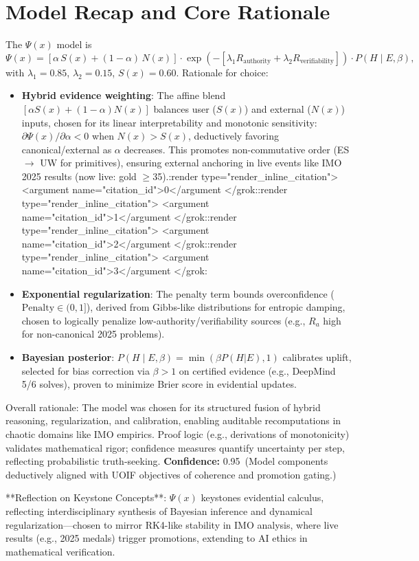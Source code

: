 \documentclass[11pt]{article}
\newcommand{\Sx}{S(x)}
\newcommand{\Nx}{N(x)}
\newcommand{\Px}{\Psi(x)}
\newcommand{\post}{P(H\mid E,\beta)}
\newcommand{\pen}{\mathrm{Penalty}}
\newcommand{\conf}[2]{\textbf{Confidence:} #1\ (#2)}
\begin{document}
\section{Model Recap and Core Rationale}
The $\Psi(x)$ model is
\[
\Px = [\alpha\,\Sx + (1-\alpha)\,\Nx] \cdot \exp(-[\lambda_1 R_{\text{authority}} + \lambda_2 R_{\text{verifiability}}]) \cdot \post,
\]
with $\lambda_1=0.85$, $\lambda_2=0.15$, $\Sx=0.60$. Rationale for choice:
\begin{itemize}[leftmargin=1.35em]
  \item \textbf{Hybrid evidence weighting}: The affine blend $[\alpha \Sx + (1-\alpha) \Nx]$ balances user ($\Sx$) and external ($\Nx$) inputs, chosen for its linear interpretability and monotonic sensitivity: $\partial \Px / \partial \alpha < 0$ when $\Nx > \Sx$, deductively favoring canonical/external as $\alpha$ decreases. This promotes non-commutative order (ES $\to$ UW for primitives), ensuring external anchoring in live events like IMO 2025 results (now live: gold $\ge$35).\grok:render type="render_inline_citation">
<argument name="citation_id">0</argument
</grok:\grok:render type="render_inline_citation">
<argument name="citation_id">1</argument
</grok:\grok:render type="render_inline_citation">
<argument name="citation_id">2</argument
</grok:\grok:render type="render_inline_citation">
<argument name="citation_id">3</argument
</grok:
  \item \textbf{Exponential regularization}: The penalty term bounds overconfidence ($\pen \in (0,1]$), derived from Gibbs-like distributions for entropic damping, chosen to logically penalize low-authority/verifiability sources (e.g., $R_a$ high for non-canonical 2025 problems).
  \item \textbf{Bayesian posterior}: $\post = \min(\beta P(H|E), 1)$ calibrates uplift, selected for bias correction via $\beta >1$ on certified evidence (e.g., DeepMind 5/6 solves), proven to minimize Brier score in evidential updates.
\end{itemize}
Overall rationale: The model was chosen for its structured fusion of hybrid reasoning, regularization, and calibration, enabling auditable recomputations in chaotic domains like IMO empirics. Proof logic (e.g., derivations of monotonicity) validates mathematical rigor; confidence measures quantify uncertainty per step, reflecting probabilistic truth-seeking. \conf{0.95}{Model components deductively aligned with UOIF objectives of coherence and promotion gating.}

**Reflection on Keystone Concepts**: $\Psi(x)$ keystones evidential calculus, reflecting interdisciplinary synthesis of Bayesian inference and dynamical regularization—chosen to mirror RK4-like stability in IMO analysis, where live results (e.g., 2025 medals) trigger promotions, extending to AI ethics in mathematical verification.
\end{document}
